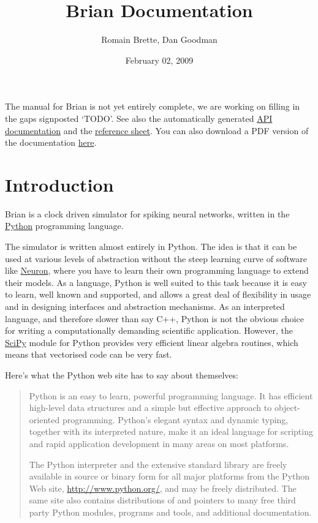 \documentclass[letterpaper,10pt,english]{manual}
\title{Brian Documentation}
\date{February 02, 2009}
\author{Romain Brette, Dan Goodman}
\begin{document}
\maketitle
\tableofcontents


The manual for Brian is not yet entirely complete, we are working on filling in the gaps signposted `TODO'.
See also the automatically generated \href{http://brian.di.ens.fr/docs/api/}{API documentation} and
the \href{http://brian.di.ens.fr//BrianReference.pdf}{reference sheet}. You can also download a PDF
version of the documentation \href{http://brian.di.ens.fr/docs/Brian.pdf}{here}.

\resetcurrentobjects


\chapter{Introduction}

Brian is a clock driven simulator for spiking neural networks, written in the \href{http://www.python.org}{Python} programming language.

The simulator is written almost entirely in Python. The idea is that
it can be used at various levels
of abstraction without the steep learning curve of software like \href{http://www.neuron.yale.edu/neuron/}{Neuron}, where you have to learn their
own programming language to extend their models. As a language, Python is well suited to this task
because it is easy to learn, well known and supported, and allows a great deal of flexibility in usage
and in designing interfaces and abstraction mechanisms. As an interpreted language, and therefore slower
than say C++, Python is not the obvious choice for writing a computationally demanding scientific
application. However, the \href{http://www.scipy.org/}{SciPy} module for Python provides very efficient linear algebra routines, which
means that vectorised code can be very fast.

Here's what the Python web site has to say about themselves:
\begin{quote}

Python is an easy to learn, powerful programming language. It has efficient
high-level data structures and a simple but effective approach to
object-oriented programming. Python's elegant syntax and dynamic typing,
together with its interpreted nature, make it an ideal language for
scripting and rapid application development in many areas on most platforms.

The Python interpreter and the extensive standard library are freely
available in source or binary form for all major platforms from the
Python Web site, \href{http://www.python.org/}{http://www.python.org/}, and may be freely distributed.
The same site also contains distributions of and pointers to many free
third party Python modules, programs and tools, and additional documentation.
\end{quote}
\end{document}
